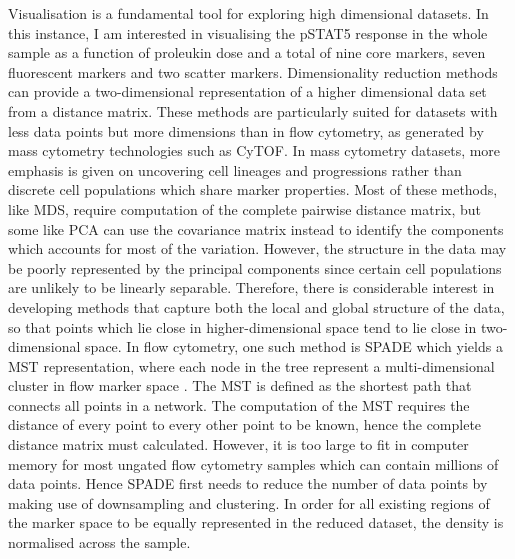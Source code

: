Visualisation is a fundamental tool for exploring high dimensional datasets.
In this instance, I am interested in visualising the pSTAT5 response in the whole sample as a function of proleukin dose and a total of nine core markers, seven fluorescent markers and two scatter markers.
Dimensionality reduction methods can provide a two-dimensional representation of a higher dimensional data set from a distance matrix.
These methods are particularly suited for datasets with less data points but more dimensions than in flow cytometry,
as generated by mass cytometry technologies such as CyTOF.
In mass cytometry datasets, more emphasis is given on uncovering cell lineages and progressions rather than discrete cell populations which share marker
properties.
Most of these methods, like \gls{MDS}, require computation of the complete pairwise distance matrix,
but some like \gls{PCA} can use the covariance matrix instead to identify the components which accounts for most of the variation. 
However, the structure in the data may be poorly represented by the principal components since certain cell populations are unlikely to be linearly separable.
Therefore, there is considerable interest in developing methods that capture both the local and global structure of the data, so that points which lie close in higher-dimensional space tend to lie close in two-dimensional space.
In flow cytometry, one such method is \acrfull{SPADE} which yields a \acrfull{MST} representation,
where each node in the tree represent a multi-dimensional cluster in flow marker space \citep{Simonds:2011jh}.
The \gls{MST} is defined as the shortest path that connects all points in a network.
The computation of the \gls{MST} requires the distance of every point to every other point to be known, hence the complete distance matrix must calculated.
However, it is too large to fit in computer memory for most ungated flow cytometry samples which can contain millions of data points.
Hence \gls{SPADE} first needs to reduce the number of data points by making use of downsampling and clustering.
In order for all existing regions of the marker space to be equally represented in the reduced dataset, the density is normalised across the sample.

